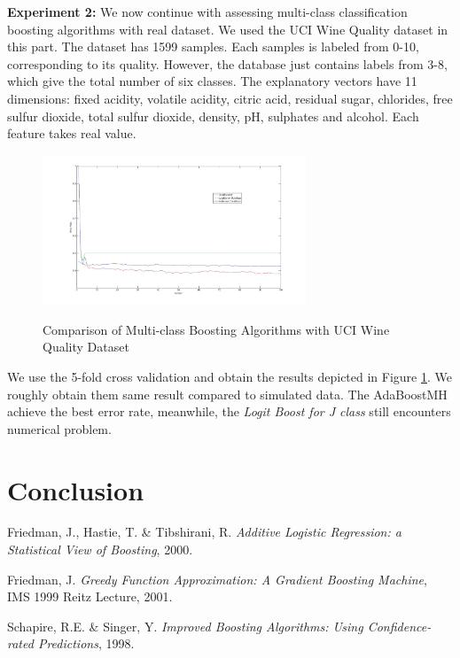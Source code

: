 \documentclass[a4paper,twoside,12pt]{article}
\begin{document}
\textbf{Experiment 2:} We now continue with assessing multi-class classification boosting algorithms with real dataset. We used the UCI Wine Quality dataset in this part. The dataset has 1599 samples. Each samples is labeled from 0-10, corresponding to its quality. However, the database just contains   labels from 3-8, which give the total number of six classes. The explanatory vectors have 11 dimensions: fixed acidity, volatile acidity, citric acid, residual sugar, chlorides, free sulfur dioxide, total sulfur dioxide, density, pH, sulphates and alcohol. Each feature takes real value.
\begin{figure}[H]
\centering
\caption{Comparison of Multi-class Boosting Algorithms with UCI Wine Quality Dataset}
\includegraphics[width = 0.7\textwidth]{Figures/wine_quality}
\label{fig:wine_quality}
\end{figure}
We use the 5-fold cross validation and obtain the results depicted in Figure \ref{fig:wine_quality}. We roughly obtain them same result compared to simulated data. The AdaBoostMH achieve the best error rate, meanwhile, the \textit{Logit Boost for J class} still encounters numerical problem.

\section{Conclusion}

\begin{thebibliography}{9999}%
Friedman, J., Hastie, T. \& Tibshirani, R. \textsl{Additive Logistic Regression: a Statistical View of Boosting}, 2000.

Friedman, J. \textsl{Greedy Function Approximation: A Gradient Boosting Machine}, IMS 1999 Reitz Lecture, 2001.

Schapire, R.E. \& Singer, Y. \textsl{Improved Boosting Algorithms: Using Confidence-rated Predictions}, 1998.

\end{thebibliography}
\end{document}
